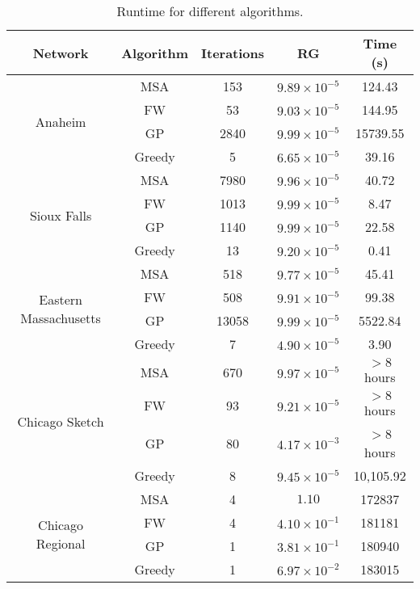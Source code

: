 \begin{table}
\caption{Runtime for different algorithms.}
\label{table:resulttable}
\center
\begin{tabular}{|c|c|c|c|c|}
\hline
Network	&	Algorithm	&	Iterations	&	RG	& Time (s)\\
\hline
\multirow{4}{*}{Anaheim}
	&	MSA	&	153	&	$9.89\times 10^{-5}$	&	124.43\\
	&	FW	&	53	&	$9.03\times 10^{-5}$	&	144.95\\
	&	GP	&	2840	&	$9.99\times 10^{-5}$	&	15739.55\\
	&	Greedy	&	5	&	$6.65\times 10^{-5}$	&	39.16\\
	\hline
\multirow{4}{*}{Sioux Falls}
	&	MSA		&	7980	&	$9.96\times 10^{-5}$	&	40.72\\
	&	FW		&	1013	&	$9.99\times 10^{-5}$	&	8.47\\
	&	GP		&	1140	&	$9.99\times 10^{-5}$	&	22.58\\
	&	Greedy	&	13		&	$9.20\times 10^{-5}$	&	0.41\\
\hline
\multirow{4}{*}{Eastern Massachusetts}
	&	MSA		&	518	&	$9.77\times 10^{-5}$	&	45.41\\
	&	FW		&	508	&	$9.91\times 10^{-5}$	&	99.38\\
	&	GP		&	13058	&	$9.99\times 10^{-5}$	&	5522.84\\
	&	Greedy	&	7		&	$4.90\times 10^{-5}$	&	3.90\\
	\hline
\multirow{4}{*}{Chicago Sketch}
	&	MSA		&	670	&	$9.97\times 10^{-5}$	&	$>8$ hours\\
	&	FW		&	93	&	$9.21\times 10^{-5}$	&	$>8$ hours\\
	&	GP		&	80	&	$4.17\times 10^{-3}$	&	$>$8 hours\\
	&	Greedy  &	8	&	$9.45\times 10^{-5}$	&	10,105.92\\
	\hline
\multirow{4}{*}{Chicago Regional}
	& MSA	&	4	&	$1.10$	&	172837\\
	& FW	&	4	&	$4.10\times 10^{-1}$	&	181181\\
	& GP	&	1	&	$3.81\times 10^{-1}$	&	180940\\
	& Greedy	&	1	&	$6.97\times 10^{-2}$	&	183015\\
\hline
\end{tabular}
\end{table}
